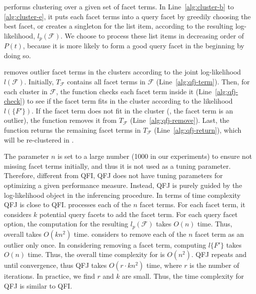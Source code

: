  performs clustering over a given set of facet terms.
In Line~\ref{alg:cluster-b} to \ref{alg:cluster-e}, it puts each facet terms into a query facet by greedily choosing the best facet, or creates a singleton for the list item, according to the resulting log-likelihood, $l_p(\mathcal{F})$.
We choose to process these list items in decreasing order of $P(t)$, because it is more likely to form a good query facet in the beginning by doing so.

 removes outlier facet terms in the clusters according to the joint log-likelihood $l(\mathcal{F})$. Initially, $T_\mathcal{F}$ contains all facet terms in $\mathcal{F}$ (Line~\ref{alg:qfj-term}). Then, for each cluster in $\mathcal{F}$, the function checks each facet term inside it (Line~\ref{alg:qfj-check}) to see if the facet term fits in the cluster according to the likelihood $l(\{F'\})$. If the facet term does not fit in the cluster (\ie, the facet term is an outlier), the function removes it from $T_\mathcal{F}$ (Line~\ref{alg:qfj-remove}). Last, the function returns the remaining facet terms in $T_\mathcal{F}$ (Line~\ref{alg:qfj-return}), which will be re-clustered in .

The parameter $n$ is set to a large number (1000 in our experiments) to ensure not missing facet terms initially, and thus it is not used as a tuning parameter. Therefore, different from QFI, QFJ does not have tuning parameters for optimizing a given performance measure. Instead, QFJ is purely guided by the log-likelihood object in the inferencing procedure. In terms of time complexity QFJ is close to QFI.  processes each of the $n$ facet terms. For each facet term, it considers $k$ potential query facets to add the facet term. For each query facet option, the computation for the resulting $l_p(\mathcal{F})$ takes $O(n)$ time. Thus, overall  takes $O(kn^2)$ time.  considers to remove each of the $n$ facet term as an outlier only once. In considering removing a facet term, computing $l\{F'\}$ takes $O(n)$ time. Thus, the overall time complexity for  is $O(n^2)$. QFJ repeats  and  until convergence, thus QFJ takes $O(r \cdot k n^2)$ time, where $r$ is the number of iterations. In practice, we find $r$ and $k$ are small. Thus, the time complexity for QFJ is similar to QFI.


